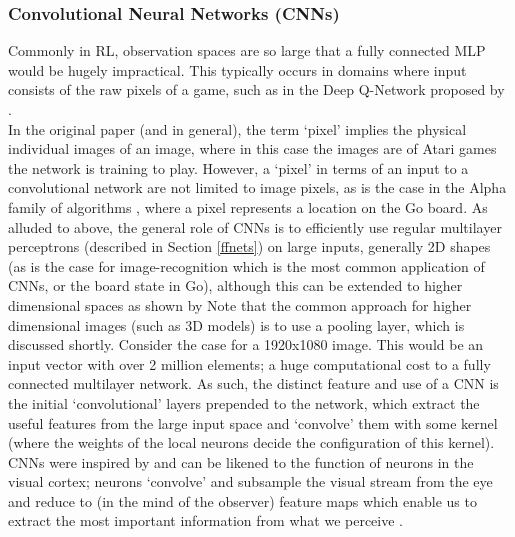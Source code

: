 \documentclass[12pt]{article}
\begin{document}
\subsubsection{Convolutional Neural Networks (CNNs)}\label{cnns}
Commonly in RL, observation spaces are so large that a fully connected MLP would be hugely impractical. This typically occurs in domains where input consists of the raw pixels of a game, such as in the Deep Q-Network proposed by \textcite{Mnih2015}. \\\newline In the original paper (and in general), the term `pixel' implies the physical individual images of an image, where in this case the images are of Atari games the network is training to play. However, a `pixel' in terms of an input to a convolutional network are not limited to image pixels, as is the case in the Alpha family of algorithms \autocite{Silver2017,Silver2016,MuZero}, where a pixel represents a location on the Go board. 
As alluded to above, the general role of CNNs is to efficiently use regular multilayer perceptrons (described in Section \ref{ffnets}) on large inputs, generally 2D shapes (as is the case for image-recognition which is the most common application of CNNs, or the board state in Go), although this can be extended to higher dimensional spaces as shown by \textcite{Choy_2020_CVPR} Note that the common approach for higher dimensional images (such as 3D models) is to use a pooling layer, which is discussed shortly. Consider the case for a 1920x1080 image. This would be an input vector with over 2 million elements; a huge computational cost to a fully connected multilayer network. As such, the distinct feature and use of a CNN is the initial `convolutional' layers prepended to the network, which extract the useful features from the large input space and `convolve' them with some kernel (where the weights of the local neurons decide the configuration of this kernel). CNNs were inspired by and can be likened to the function of neurons in the visual cortex; neurons `convolve' and subsample the visual stream from the eye and reduce to (in the mind of the observer) feature maps which enable us to extract the most important information from what we perceive \autocite{lindsay2021convolutional}. \\\newline
\end{document}
